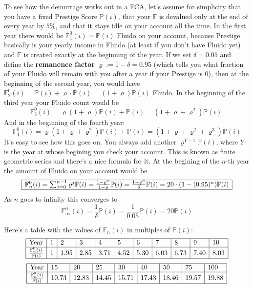 \documentclass[a4paper,12pt]{scrartcl}
\newcounter{formula}
\begin{document}
To see how the demurrage works out in a FCA, let's assume for simplicity that you have a fixed Prestige Score $\mathbb{P}(i)$, that your $\mathbb{F}$ is devalued only at the end of every year by $5 \%$, and that it stays idle on your account all the time.
In the first year there would be $\mathbb{F}^0_1(i)=\mathbb{P}(i)$ Fluido on your account, because Prestige basically is your yearly income in Fluido (at least if you don't have Fluido yet) and $\mathbb{F}$ is created exactly at the beginning of the year. If we set $\delta=0.05$ and define the \textbf{remanence factor} $\varrho := 1-\delta=0.95$ (which tells you what fraction of your Fluido will remain with you after a year if your Prestige is 0), then at the beginning of the second year, you would have $\mathbb{F}^0_2(i)=\mathbb{P}(i)+\varrho\cdot \mathbb{P}(i)=(1+\varrho)\mathbb{P}(i)$ Fluido. In the beginning of the third year your Fluido count would be
$$\mathbb{F}^0_3(i)=\varrho(1+\varrho)\mathbb{P}(i)+\mathbb{P}(i)=(1+\varrho+\varrho^2)\mathbb{P}(i).$$
And in the beginning of the fourth year:
$$\mathbb{F}^0_4(i)=\varrho(1+\varrho+\varrho^2)\mathbb{P}(i)+\mathbb{P}(i)=(1+\varrho+\varrho^2+\varrho^3)\mathbb{P}(i)$$
It's easy to see how this goes on. You always add another $\varrho^{Y-1}\mathbb{P}(i)$, where $Y$ is the year at whose begining you check your account. This is known as finite geometric series and there's a nice formula for it. At the begining of the $n$-th year the amount of Fluido on your account would be
$$
\begin{array}{|l|}
\hline
\mathbb{F}^0_n(i)= \sum_{j=0}^{n-1}\varrho^j \mathbb{P}(i) = \frac{1-\varrho^n}{1-\varrho} \mathbb{P}(i) = \frac{1-\varrho^n}{\delta} \mathbb{P}(i) = 20 \cdot (1-(0.95)^n) \mathbb{P}(i) \\
\hline
\end{array}$$
As $n$ goes to infinity this converges to
$$\mathbb{F}_{\infty}^0(i)= \frac{1}{\delta} \mathbb{P}(i) = \frac{1}{0.05} \mathbb{P}(i) = 20 \mathbb{P}(i)$$ 

Here's a table with the values of $\mathbb{F}_n(i)$ in multiples of $\mathbb{P}(i)$:
$$
\begin{array}{|l|l|l|l|l|l|l|l|l|l|l|l|l|l|l|}
\hline
\mbox{Year} & 1 & 2 & 3 & 4 & 5 & 6 & 7 & 8 & 9 & 10\\
\hline
\frac{\mathbb{F}^0_n(i)}{\mathbb{P}(i)} & 1 & 1.95 & 2.85 & 3.71 & 4.52 & 5.30 & 6.03 & 6.73 & 7.40 & 8.03  \\
\hline
\end{array}
$$
$$
\begin{array}{|l|l|l|l|l|l|l|l|l|l|l|l|l|l|l|}
\hline
\mbox{Year} & 15 & 20 & 25 & 30 & 40 & 50 & 75 & 100\\
\hline
\frac{\mathbb{F}^0_n(i)}{\mathbb{P}(i)} & 10.73 & 12.83 & 14.45 & 15.71 & 17.43 & 18.46 & 19.57 & 19.88 \\
\hline
\end{array}
$$
\end{document}

